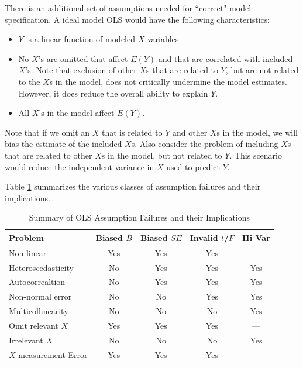 \documentclass[11pt,openany]{book}
\begin{document}
There is an additional set of assumptions needed for ``correct" model specification. A ideal model OLS would have the following characteristics: 
\begin{itemize}
\item $Y$ is a linear function of modeled $X$ variables
\item No $X$'s are omitted that affect $E(Y)$ and that are correlated with included $X$'s. Note that exclusion of other $X$s that are related to $Y$, but are not related to the $X$s in the model, does not critically undermine the model estimates. However, it does reduce the overall ability to explain $Y$. 
\item All $X$'s in the model affect $E(Y)$.  
\end{itemize}
Note that if we omit an $X$ that is related to $Y$ and other $X$s in the model, we will bias the estimate of the included $X$s.  Also consider the problem of including $X$s that are related to other $X$s in the model, but not related  to $Y$. This scenario would reduce the independent variance in $X$ used to predict $Y$.

Table \ref{tab:ass} summarizes the various classes of assumption failures and their implications. 

\begin{center}
\begin{table}[h]
\caption{Summary of OLS Assumption Failures and their Implications}
\label{tab:ass}
\begin{tabular}{lcccc}
\hline
Problem               & Biased $B$ & Biased $SE$ & Invalid $t$/$F$ & Hi Var \\
\hline
Non-linear            & Yes        & Yes         & Yes             & ---    \\
Heteroscedasticity    & No         & Yes         & Yes             & Yes    \\
Autocorrealtion       & No         & Yes         & Yes             & Yes    \\
Non-normal error      & No         & No          & Yes             & Yes    \\
Multicollinearity     & No         & No          & No              & Yes    \\
Omit relevant $X$     & Yes        & Yes         & Yes             & ---    \\
Irrelevant $X$        & No         & No          & No              & Yes    \\
$X$ measurement Error & Yes        & Yes         & Yes             & ---   \\
\hline
\end{tabular}
\end{table}
\end{center}
\end{document}

